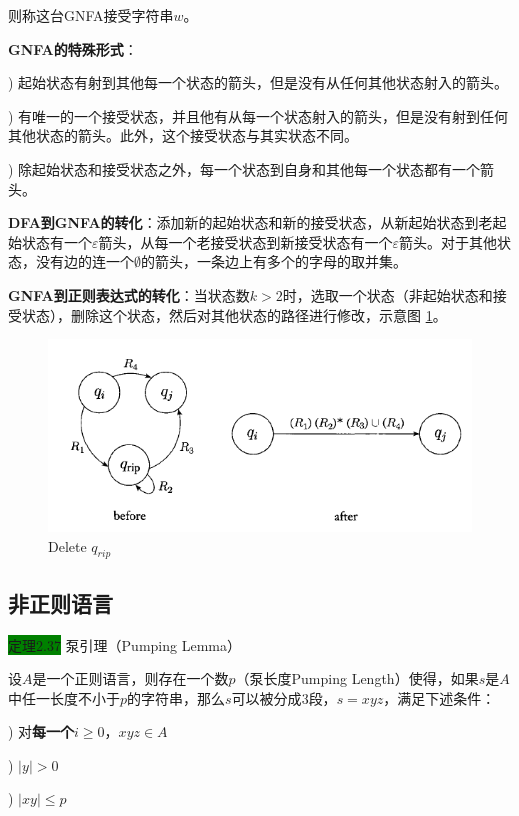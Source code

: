 \documentclass[a4paper]{article}
\begin{document}
	则称这台GNFA接受字符串$w$。

	\textbf{GNFA的特殊形式}：
	
	) 起始状态有射到其他每一个状态的箭头，但是没有从任何其他状态射入的箭头。
	
	) 有唯一的一个接受状态，并且他有从每一个状态射入的箭头，但是没有射到任何其他状态的箭头。此外，这个接受状态与其实状态不同。
	
	) 除起始状态和接受状态之外，每一个状态到自身和其他每一个状态都有一个箭头。
	
	\textbf{DFA到GNFA的转化}：添加新的起始状态和新的接受状态，从新起始状态到老起始状态有一个$\varepsilon$箭头，从每一个老接受状态到新接受状态有一个$\varepsilon$箭头。对于其他状态，没有边的连一个$\emptyset$的箭头，一条边上有多个的字母的取并集。
	
	\textbf{GNFA到正则表达式的转化}：当状态数$k>2$时，选取一个状态（非起始状态和接受状态），删除这个状态，然后对其他状态的路径进行修改，示意图 \ref{F020302}。
	
	\begin{figure}[htb]
		\centering
		\includegraphics[scale=0.8]{./figure/2.3.2.png}
		\caption{Delete $q_{rip}$}
		\label{F020302}
	\end{figure}

\subsection{非正则语言}

	\colorbox{green}{定理2.37} 泵引理（Pumping Lemma）
	
	设$A$是一个正则语言，则存在一个数$p$（泵长度Pumping Length）使得，如果$s$是$A$中任一长度不小于$p$的字符串，那么$s$可以被分成$3$段，$s=xyz$，满足下述条件：
	
	) 对\textbf{每一个$i \geq 0$}，$xyz \in A$
	
	) $|y|>0$
	
	) $|xy| \leq p$
\end{document}
